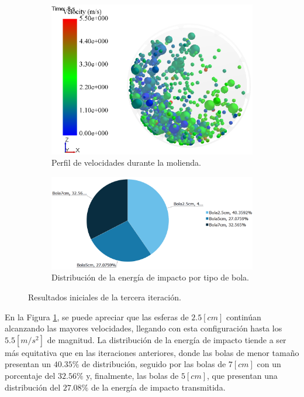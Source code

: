 \begin{figure}[h!]
	\centering
	\begin{subfigure}[b]{0.66\textwidth}
		\centering
		\includegraphics[width=\textwidth]{Images/Resultados/Sim3/sim3.PNG}
		\caption{Perfil de velocidades durante la molienda.}
	\end{subfigure}
	\hfill
	\begin{subfigure}[b]{0.9\textwidth}
		\centering
		\includegraphics[width=\textwidth]{Images/Resultados/Sim3/dist3.PNG}
	\caption{Distribuci\'on de la energ\'ia de impacto por tipo de bola.}
	\end{subfigure}
	\caption{Resultados iniciales de la tercera iteraci\'on.}
	\label{resul3}
\end{figure}

\noindent
\justify

En la Figura \ref{resul3}, se puede apreciar que las esferas de $2.5 [cm]$ contin\'uan alcanzando las mayores velocidades, llegando con esta configuraci\'on hasta los $5.5 \left[m/s^2 \right]$ de magnitud. La distribuci\'on de la energ\'ia de impacto tiende a ser m\'as equitativa que en las iteraciones anteriores, donde las bolas de menor tama\~no presentan un $40.35 \%$ de distribuci\'on, seguido por las bolas de $7 [cm]$ con un porcentaje del $32.56 \%$ y, finalmente, las bolas de $5 [cm]$, que presentan una distribuci\'on del $27.08 \%$ de la energ\'ia de impacto transmitida.


